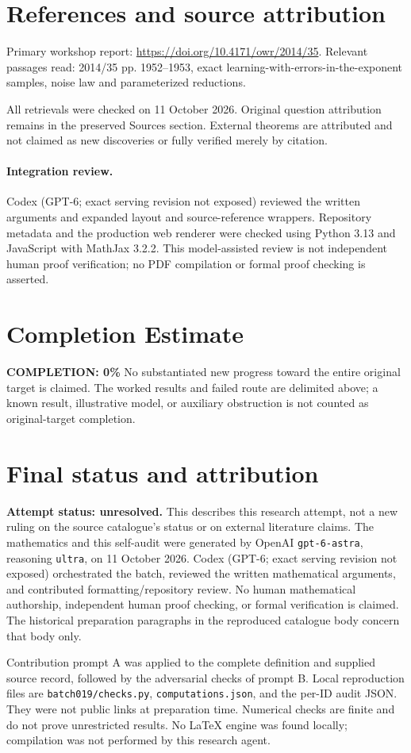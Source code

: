 \documentclass[11pt]{article}
\begin{document}
\section{References and source attribution}
Primary workshop report: \url{https://doi.org/10.4171/owr/2014/35}. Relevant passages read: 2014/35 pp. 1952--1953, exact learning-with-errors-in-the-exponent samples, noise law and parameterized reductions.

All retrievals were checked on 11 October 2026. Original question attribution remains in the preserved Sources section. External theorems are attributed and not claimed as new discoveries or fully verified merely by citation.


\paragraph{Integration review.} Codex (GPT-6; exact serving revision not exposed) reviewed the written arguments and expanded layout and source-reference wrappers. Repository metadata and the production web renderer were checked using Python 3.13 and JavaScript with MathJax 3.2.2. This model-assisted review is not independent human proof verification; no PDF compilation or formal proof checking is asserted.

\section{Completion Estimate}
\noindent\textbf{COMPLETION: 0\%}
No substantiated new progress toward the entire original target is claimed. The worked results and failed route are delimited above; a known result, illustrative model, or auxiliary obstruction is not counted as original-target completion.

\section{Final status and attribution}
\textbf{Attempt status: unresolved.} This describes this research attempt, not a new ruling on the source catalogue's status or on external literature claims.
The mathematics and this self-audit were generated by OpenAI \texttt{gpt-6-astra}, reasoning \texttt{ultra}, on 11 October 2026. Codex (GPT-6; exact serving revision not exposed) orchestrated the batch, reviewed the written mathematical arguments, and contributed formatting/repository review. No human mathematical authorship, independent human proof checking, or formal verification is claimed. The historical preparation paragraphs in the reproduced catalogue body concern that body only.

Contribution prompt A was applied to the complete definition and supplied source record, followed by the adversarial checks of prompt B. Local reproduction files are \texttt{batch019/checks.py}, \texttt{computations.json}, and the per-ID audit JSON. They were not public links at preparation time. Numerical checks are finite and do not prove unrestricted results. No LaTeX engine was found locally; compilation was not performed by this research agent.
\end{document}
